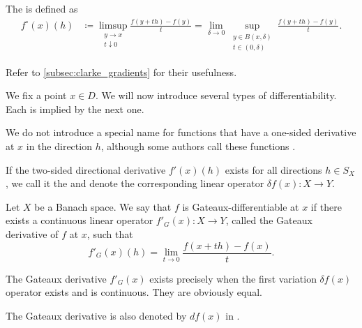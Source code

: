 \begin{definition}
\begin{defenum}
    \cite[section 10.1]{Clarke2013} The  is defined as
    \begin{align*}
      f^\circ(x)(h)
      &\coloneqq
      \limsup_{\substack{y \to x \\ t \downarrow 0}} \frac {f(y + th) - f(y)} t
      =
      \lim_{\delta \to 0} \sup_{\substack{y \in B(x, \delta) \\ t \in (0, \delta)}} \frac {f(y + th) - f(y)} t.
    \end{align*}

    Refer to \cref{subsec:clarke_gradients} for their usefulness.
  \end{defenum}
\end{definition}

\begin{definition}\label{def:differentiability}
  We fix a point \( x \in D \). We will now introduce several types of differentiability. Each is implied by the next one.

  \begin{defenum}
    \item We do not introduce a special name for functions that have a one-sided derivative at \( x \) in the direction \( h \), although some authors call these functions . %

    \cite[0.2.1]{Ioffe1974} If the two-sided directional derivative \( f'(x)(h) \) exists for all directions \( h \in S_X \), we call it the  and denote the corresponding linear operator \( \delta f(x): X \to Y \).

    \cite[definition 1.12]{Phelps1993} Let \( X \) be a Banach space. We say that \( f \) is Gateaux-differentiable at \( x \) if there exists a continuous linear operator \( f'_G(x): X \to Y \), called the Gateaux derivative of \( f \) at \( x \), such that
    \begin{equation*}
      f'_G(x)(h) = \lim_{t \to 0} \frac {f(x + th) - f(x)} t.
    \end{equation*}

    The Gateaux derivative \( f'_G(x) \) exists precisely when the first variation \( \delta f(x) \) operator exists and is continuous. They are obviously equal.

    The Gateaux derivative is also denoted by \( df(x) \) in \cite[definition 1.12]{Phelps1993}.


\end{defenum}
\end{definition}
